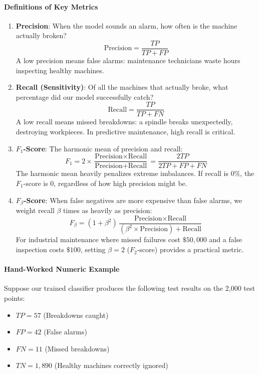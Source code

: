 \paragraph{Definitions of Key Metrics}
\begin{enumerate}
    \item \textbf{Precision}: When the model sounds an alarm, how often is the machine actually broken?
    \begin{equation}
    \text{Precision} = \frac{TP}{TP + FP}\label{eq:precision}
    \end{equation}
    A low precision means false alarms: maintenance technicians waste hours inspecting healthy machines.

    \item \textbf{Recall (Sensitivity)}: Of all the machines that actually broke, what percentage did our model successfully catch?
    \begin{equation}
    \text{Recall} = \frac{TP}{TP + FN}\label{eq:recall}
    \end{equation}
    A low recall means missed breakdowns: a spindle breaks unexpectedly, destroying workpieces. In predictive maintenance, high recall is critical.

    \item \textbf{$F_1$-Score}: The harmonic mean of precision and recall:
    \begin{equation}
    F_1 = 2 \times \frac{\text{Precision} \times \text{Recall}}{\text{Precision} + \text{Recall}} = \frac{2 TP}{2 TP + FP + FN}\label{eq:f1_score}
    \end{equation}
    The harmonic mean heavily penalizes extreme imbalances. If recall is $0\%$, the $F_1$-score is $0$, regardless of how high precision might be.

    \item \textbf{$F_\beta$-Score}: When false negatives are more expensive than false alarms, we weight recall $\beta$ times as heavily as precision:
    \begin{equation}
    F_\beta = (1 + \beta^2) \frac{\text{Precision} \times \text{Recall}}{(\beta^2 \times \text{Precision}) + \text{Recall}}\label{eq:f_beta}
    \end{equation}
    For industrial maintenance where missed failures cost $\$50{,}000$ and a false inspection costs $\$100$, setting $\beta = 2$ ($F_2$-score) provides a practical metric.
\end{enumerate}

\paragraph{Hand-Worked Numeric Example}
Suppose our trained classifier produces the following test results on the 2,000 test points:
\begin{itemize}
    \item $TP = 57$ (Breakdowns caught)
    \item $FP = 42$ (False alarms)
    \item $FN = 11$ (Missed breakdowns)
    \item $TN = 1{,}890$ (Healthy machines correctly ignored)
\end{itemize}

